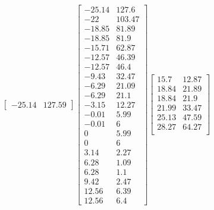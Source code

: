 \documentclass[12pt]{article}
\begin{document}
\begin{enumerate}
\begin{itemize}
\[\begin{bmatrix}
             -25.14          &          127.59
            \end{bmatrix}
            \begin{bmatrix}
                -25.14          &           127.6 \\
                -22          &          103.47\\
             -18.85          &           81.89\\
             -18.85          &            81.9\\
             -15.71          &           62.87\\
             -12.57          &           46.39\\
             -12.57          &            46.4\\
              -9.43          &           32.47\\
              -6.29          &           21.09\\
              -6.29          &            21.1\\
              -3.15          &           12.27\\
              -0.01          &            5.99\\
              -0.01          &               6\\
                  0          &            5.99\\
                  0          &               6\\
               3.14          &            2.27\\
               6.28          &            1.09\\
               6.28          &             1.1\\
               9.42          &            2.47\\
              12.56          &            6.39\\
              12.56          &             6.4
            \end{bmatrix}
            \begin{bmatrix}
               15.7          &           12.87\\
              18.84          &           21.89\\
              18.84          &            21.9\\
              21.99          &           33.47\\
              25.13          &           47.59\\
              28.27          &           64.27\\

\end{bmatrix}\]
\end{itemize}
\end{enumerate}
\end{document}
